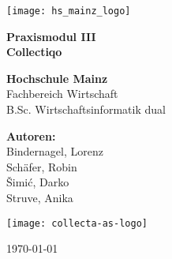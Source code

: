 \begin{titlepage}
    \centering
    \vspace*{1cm}

    \texttt{[image: hs\_mainz\_logo]}\\
    \vspace{1.5cm}

    \textbf{\LARGE Praxismodul III}\\
    \vspace{0.5cm}
    \textbf{\Large Collectiqo}\\
    \vspace{1.5cm}

    \textbf{Hochschule Mainz}\\
    \vspace{0.5cm}
    Fachbereich Wirtschaft\\
    \vspace{0.5cm}
    B.Sc. Wirtschaftsinformatik dual\\
    \vspace{1.5cm}

    \textbf{Autoren:}\\
    Bindernagel, Lorenz\\
    Schäfer, Robin\\
    Šimić, Darko\\
    Struve, Anika\\

    \vspace{1.5cm}
    
    \texttt{[image: collecta-as-logo]}\\
    \vfill

    \today
\end{titlepage}